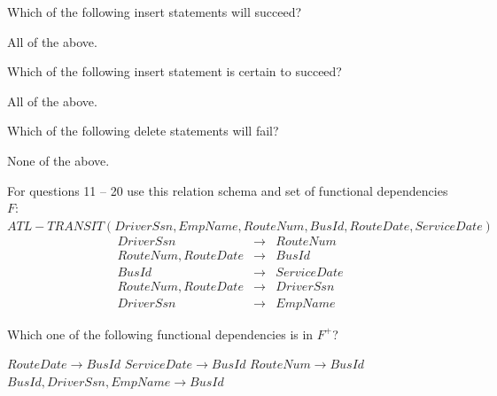 \documentclass[10pt]{exam}
\begin{document}
\begin{questions}
\begin{verbatim}
\end{verbatim}

\question[4] Which of the following insert statements will succeed?

\begin{choices}
\choice All of the above.
\end{choices}

\question[4] Which of the following insert statement is certain to succeed?

\begin{choices}
\choice All of the above.
\end{choices}

\question[4] Which of the following delete statements will fail?

\begin{choices}
\choice None of the above.
\end{choices}

\newpage

For questions 11 -- 20 use this relation schema and set of functional dependencies $F$:\\

$ATL-TRANSIT(DriverSsn, EmpName, RouteNum, BusId, RouteDate, ServiceDate)$
\begin{eqnarray*}
  DriverSsn & \rightarrow & RouteNum\\
  RouteNum,RouteDate & \rightarrow & BusId\\
  BusId & \rightarrow & ServiceDate\\
  RouteNum,RouteDate & \rightarrow & DriverSsn\\
  DriverSsn & \rightarrow & EmpName
\end{eqnarray*}

\question[4] Which one of the following functional dependencies is in $F^+$?

\begin{choices}
\choice $RouteDate \rightarrow  BusId$
\choice $ServiceDate \rightarrow BusId$
\choice $RouteNum \rightarrow BusId$
\correctchoice $BusId,DriverSsn,EmpName \rightarrow BusId$
\end{choices}


\end{questions}
\end{document}
